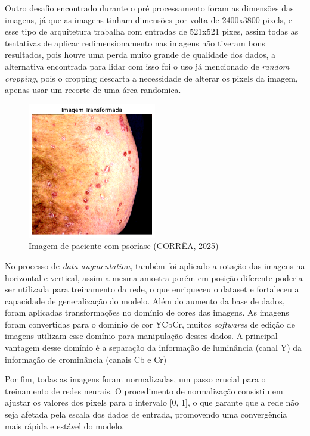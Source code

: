 Outro desafio encontrado durante o pré processamento foram as dimensões das imagens, já que as imagens tinham dimensões por volta de 2400x3800 pixels, e esse tipo de arquitetura trabalha com entradas de 521x521 pixes, assim todas as tentativas de aplicar redimensionamento nas imagens não tiveram bons resultados, pois houve uma perda muito grande de qualidade dos dados, a alternativa encontrada para lidar com isso foi o uso já mencionado de \textit{random cropping}, pois o cropping descarta a necessidade de alterar os pixels da imagem, apenas usar um recorte de uma área randomica.


\begin{figure}[h] %
    \centering
    \includegraphics[width=0.5\textwidth]{images/pre_processamento_psoriasis_jitter.png}
    \caption{Imagem de paciente com psoríase (CORRÊA, 2025)}
    \label{fig:ex-dataset}
\end{figure}
No processo de \textit{data augmentation}, também foi aplicado a rotação das imagens na horizontal e vertical, assim a mesma amostra porém em posição diferente poderia ser utilizada para treinamento da rede, o que enriqueceu o dataset e fortaleceu a capacidade de generalização do modelo. 
Além do aumento da base de dados, foram aplicadas transformações no domínio de cores das imagens. As imagens foram convertidas para o domínio de cor YCbCr, muitos \textit{softwares} de edição de imagens utilizam esse domínio para manipulação desses dados. A principal vantagem desse domínio é a separação da informação de luminância (canal Y) da informação de crominância (canais Cb e Cr)

Por fim, todas as imagens foram normalizadas, um passo crucial para o treinamento de redes neurais. O procedimento de normalização consistiu em ajustar os valores dos pixels para o intervalo [0, 1], o que garante que a rede não seja afetada pela escala dos dados de entrada, promovendo uma convergência mais rápida e estável do modelo.


